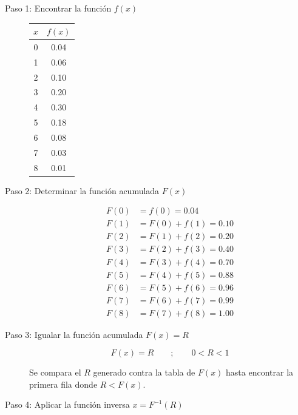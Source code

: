 \documentclass[12pt, a4paper]{article}
\begin{document}
\begin{description}
    \item[Paso 1: Encontrar la función $f(x)$]

    \begin{center}
    \begin{tabular}{cc}
    \toprule
    $x$ & $f(x)$ \\
    \midrule
    0 & 0.04 \\
    1 & 0.06 \\
    2 & 0.10 \\
    3 & 0.20 \\
    4 & 0.30 \\
    5 & 0.18 \\
    6 & 0.08 \\
    7 & 0.03 \\
    8 & 0.01 \\
    \bottomrule
    \end{tabular}
    \end{center}

    \item[Paso 2: Determinar la función acumulada $F(x)$]

    \begin{align*}
    F(0) &= f(0) = 0.04 \\
    F(1) &= F(0)+f(1) = 0.10 \\
    F(2) &= F(1)+f(2) = 0.20 \\
    F(3) &= F(2)+f(3) = 0.40 \\
    F(4) &= F(3)+f(4) = 0.70 \\
    F(5) &= F(4)+f(5) = 0.88 \\
    F(6) &= F(5)+f(6) = 0.96 \\
    F(7) &= F(6)+f(7) = 0.99 \\
    F(8) &= F(7)+f(8) = 1.00
    \end{align*}

    \item[Paso 3: Igualar la función acumulada $F(x) = R$]

    $$ F(x)=R \qquad ; \qquad 0 < R < 1 $$

    Se compara el $R$ generado contra la tabla de $F(x)$ hasta encontrar la primera fila donde $R < F(x)$.

    \item[Paso 4: Aplicar la función inversa $x=F^{-1}(R)$]


\end{description}
\end{document}
